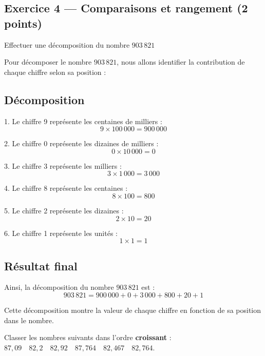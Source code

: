 \documentclass[answers]{exam}
\begin{document}
\subsection*{Exercice 4 — Comparaisons et rangement (2 points)}

\begin{questions}
  \question[0.5] Effectuer une décomposition du nombre $903\,821$
  

\begin{solution}
Pour décomposer le nombre \(903\,821\), nous allons identifier la contribution de chaque chiffre selon sa position :

\subsection*{Décomposition}

1. Le chiffre 9 représente les centaines de milliers :
   \[
   9 \times 100\,000 = 900\,000
   \]

2. Le chiffre 0 représente les dizaines de milliers :
   \[
   0 \times 10\,000 = 0
   \]

3. Le chiffre 3 représente les milliers :
   \[
   3 \times 1\,000 = 3\,000
   \]

4. Le chiffre 8 représente les centaines :
   \[
   8 \times 100 = 800
   \]

5. Le chiffre 2 représente les dizaines :
   \[
   2 \times 10 = 20
   \]

6. Le chiffre 1 représente les unités :
   \[
   1 \times 1 = 1
   \]

\subsection*{Résultat final}

Ainsi, la décomposition du nombre \(903\,821\) est :
\[
903\,821 = 900\,000 + 0 + 3\,000 + 800 + 20 + 1
\]

Cette décomposition montre la valeur de chaque chiffre en fonction de sa position dans le nombre.
\end{solution}

\question[1.5] Classer les nombres suivants dans l'ordre \textbf{croissant} :  
  $87,09 \quad 82,2 \quad 82,92 \quad 87,764 \quad 82,467 \quad 82,764$.
\end{questions}
\end{document}
